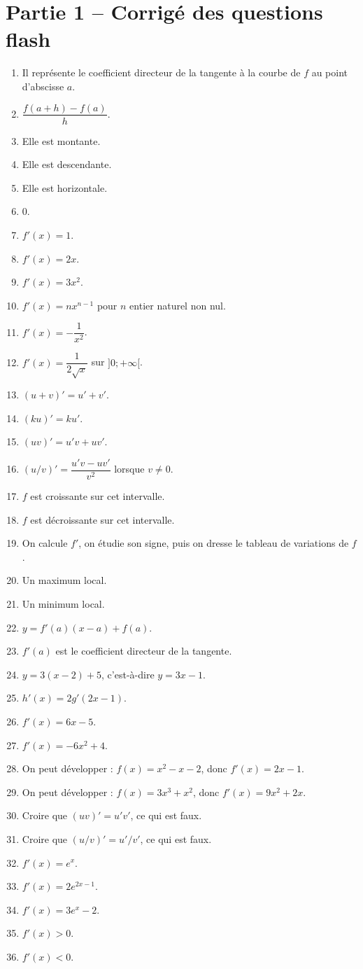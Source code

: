 \documentclass[11pt,a4paper]{article}
\newcounter{question}
\newcounter{reponse}
\newenvironment{blocreponses}[1]{%
  \begin{tcolorbox}[enhanced,breakable,colback=bleuclair,colframe=bleufonce,boxrule=0.6pt,arc=2mm,left=2mm,right=2mm,top=2mm,bottom=1.5mm,title={\bfseries #1},coltitle=white,colbacktitle=bleufonce,before skip=3mm,after skip=3mm, fontupper=\large]
  \large
  \begin{enumerate}[leftmargin=*,label=\textbf{\arabic*.},itemsep=0.42em,topsep=0.5em]
  \setcounter{enumi}{\value{reponse}}
}{%
  \setcounter{reponse}{\value{enumi}}
  \end{enumerate}
  \end{tcolorbox}
}
\begin{document}
\section*{Partie 1 -- Corrigé des questions flash}
\begin{blocreponses}{Réponses -- Questions flash}
  \item Il représente le coefficient directeur de la tangente à la courbe de $f$ au point d'abscisse $a$.
  \item $\dfrac{f(a+h)-f(a)}{h}$.
  \item Elle est montante.
  \item Elle est descendante.
  \item Elle est horizontale.
  \item $0$.
  \item $f'(x)=1$.
  \item $f'(x)=2x$.
  \item $f'(x)=3x^2$.
  \item $f'(x)=nx^{n-1}$ pour $n$ entier naturel non nul.
  \item $f'(x)=-\dfrac1{x^2}$.
  \item $f'(x)=\dfrac1{2\sqrt{x}}$ sur $]0;+\infty[$.
  \item $(u+v)'=u'+v'$.
  \item $(ku)'=ku'$.
  \item $(uv)'=u'v+uv'$.
  \item $(u/v)'=\dfrac{u'v-uv'}{v^2}$ lorsque $v\neq0$.
  \item $f$ est croissante sur cet intervalle.
  \item $f$ est décroissante sur cet intervalle.
  \item On calcule $f'$, on étudie son signe, puis on dresse le tableau de variations de $f$.
  \item Un maximum local.
  \item Un minimum local.
  \item $y=f'(a)(x-a)+f(a)$.
  \item $f'(a)$ est le coefficient directeur de la tangente.
  \item $y=3(x-2)+5$, c'est-à-dire $y=3x-1$.
  \item $h'(x)=2g'(2x-1)$.
  \item $f'(x)=6x-5$.
  \item $f'(x)=-6x^2+4$.
  \item On peut développer : $f(x)=x^2-x-2$, donc $f'(x)=2x-1$.
  \item On peut développer : $f(x)=3x^3+x^2$, donc $f'(x)=9x^2+2x$.
  \item Croire que $(uv)'=u'v'$, ce qui est faux.
  \item Croire que $(u/v)'=u'/v'$, ce qui est faux.
  \item $f'(x)=e^x$.
  \item $f'(x)=2e^{2x-1}$.
  \item $f'(x)=3e^x-2$.
  \item $f'(x)>0$.
  \item $f'(x)<0$.
\end{blocreponses}
\clearpage
\end{document}
